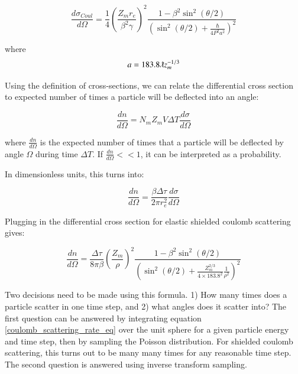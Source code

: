 \documentclass[]{article}
\begin{document}
\begin{equation} 
\frac{d\sigma_{Coul}}{d \Omega} = \frac{1}{4}\left(  \frac{Z_m r_e }{\beta^2 \gamma }  \right)^2\frac{1-\beta^2\sin^2(\theta/2)}{ \left(  \sin^2(\theta/2) + \frac{\hbar}{4P^2a^2}  \right)^2 }
\end{equation}

where
\begin{equation} 
a=183.8 \lambdabar z_m^{-1/3}
\end{equation}

Using the definition of cross-sections, we can relate the differential cross section to expected number of times a particle will be deflected into an angle:

\begin{equation} 
\frac{dn}{d \Omega} =N_m Z_m V \Delta T \frac{d \sigma}{d \Omega}
\end{equation}

where $\frac{dn}{d \Omega}$ is the expected number of times that a particle will be deflected by angle $\Omega$ during time $\Delta T$. If $\frac{dn}{d \Omega} << 1$, it can be interpreted as a probability. 

In dimensionless units, this turns into:

\begin{equation} 
\label{dimensionless_cross_section_eq}
\frac{dn}{d \Omega} =\frac{ \beta \Delta \tau }{2 \pi r_e^2} \frac{d \sigma}{d \Omega}
\end{equation}

Plugging in the differential cross section for elastic shielded coulomb scattering gives:

\begin{equation}
\label{coulomb_scattering_rate_eq}
\frac{dn}{d \Omega} =\frac{ \Delta \tau }{8 \pi \beta }\left( \frac{Z_m}{\rho} \right)^2  \frac{1-\beta^2\sin^2(\theta/2)}{ \left(  \sin^2(\theta/2) + \frac{Z_m^{2/3}}{4\times 183.8^2} \frac{1}{\rho^2} \right)^2 }
\end{equation}

Two decisions need to be made using this formula. 1) How many times does a particle scatter in one time step, and 2) what angles does it scatter into? The first question can be answered by integrating equation \ref{coulomb_scattering_rate_eq} over the unit sphere for a given particle energy and time step, then by sampling the Poisson distribution. For shielded coulomb scattering, this turns out to be many many times for any reasonable time step. The second question is answered using inverse transform sampling. 
\end{document}
